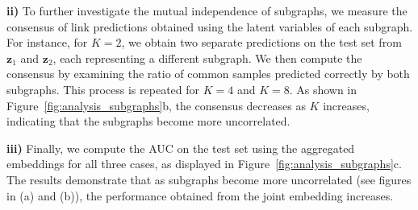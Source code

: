 \documentclass{article}
\begin{document}
\textbf{ii)} To further investigate the mutual independence of subgraphs, we measure the consensus of link predictions obtained using the latent variables of each subgraph. For instance, for $K=2$, we obtain two separate predictions on the test set from ${\bm{z}_1}$ and ${\bm{z}_2}$, each representing a different subgraph. We then compute the consensus by examining the ratio of common samples predicted correctly by both subgraphs. This process is repeated for $K=4$ and $K=8$. As shown in Figure~\ref{fig:analysis_subgraphs}b, the consensus decreases as $K$ increases, indicating that the subgraphs become more uncorrelated.

\textbf{iii)} Finally, we compute the AUC on the test set using the aggregated embeddings for all three cases, as displayed in Figure~\ref{fig:analysis_subgraphs}c. The results demonstrate that as subgraphs become more uncorrelated (see figures in (a) and (b)), the performance obtained from the joint embedding increases.
\end{document}
